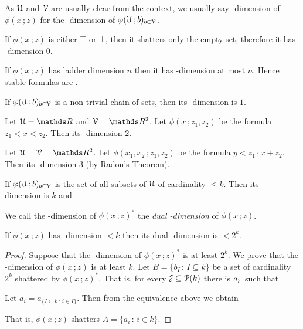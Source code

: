 \documentclass[scombinatorics.tex]{subfiles}
\begin{document}
As $\EuScript U$ and $\EuScript V$ are usually clear from the context, we usually say \vc-dimension of $\phi(x\,;z)$ for the \vc-dimension of $\varphi(\EuScript U\,;b)_{b\in\EuScript V}$.


\begin{example}
  If $\phi(x\,;z)$ is either $\top$ or $\bot$, then it shatters only the empty set, therefore it has \vc-dimension $0$.\QED
\end{example}


\begin{example}
  If $\phi(x\,;z)$ has ladder dimension $n$ then it has \vc-dimension at most $n$. Hence stable formulas are \nip.\QED
\end{example}
 
\begin{example}
  If $\varphi(\EuScript U\,;b)_{b\in\EuScript V}$ is a non trivial chain of sets, then its \vc-dimension is $1$.\QED
\end{example}
 
\begin{example} 
  Let $\U=\RR$ and $\V=\RR^2$.
  Let $\phi(x\,;z_1,z_2)$ be the formula $z_1<x<z_2$.
  Then its \vc-dimension $2$.\QED
\end{example}
 
\begin{example} 
  Let $\U=\V=\RR^2$.
  Let $\phi(x_1,x_2\,;z_1,z_2)$ be the formula $y<z_1\cdot x + z_2$.
  Then its  \vc-dimension $3$ (by Radon's Theorem).\QED
\end{example}
 
\begin{example}\label{ex_vcdim_opt}
  If $\varphi(\EuScript U\,;b)_{b\in\EuScript V}$ is the set of all subsets of $\EuScript U$ of cardinality $\le k$.
  Then its \vc-dimension is $k$ and
  
  \QED
\end{example}

We call the \vc-dimension of $\phi(x\,;z)^*$ the \emph{dual \vc-dimension\/} of  $\phi(x\,;z)$.

\begin{proposition}
  If $\phi(x\,;z)$ has \vc-dimension $<k$ then its dual \vc-dimension is $< 2^k$.
\end{proposition}
  
\begin{proof}
  Suppose that the \vc-dimension of $\phi(x\,;z)^*$ is at least $2^k$.
  We prove that the \vc-dimension of $\phi(x\,;z)$ is at least $k$.
  Let $B=\{b_I\,:\,I\subseteq k\}$ be a set of cardinality $2^k$ shattered by $\phi(x\,;z)^*$. 
  That is, for every $\EuScript J\subseteq \EuScript P(k)$ there is $a_\EuScript J$ such that
  
  
  Let $a_i=a_{\{I\subseteq k\,:\, i\in I\}}$. Then from the equivalence above we obtain
  
  
  That is, $\phi(x\,;z)$ shatters $A=\{a_i\,:\, i\in k\}$.
\end{proof}
\end{document}
